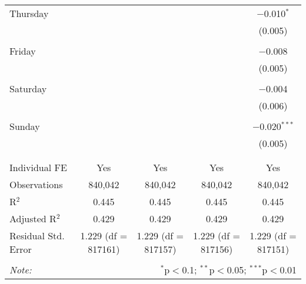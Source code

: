 \documentclass[
]{article}
\begin{document}
\begin{table}[!htbp]
{\begin{tabular}{@{\extracolsep{5pt}}lcccc}
 Thursday &  &  &  & $-$0.010$^{*}$ \\ 
  &  &  &  & (0.005) \\ 
  & & & & \\ 
 Friday &  &  &  & $-$0.008 \\ 
  &  &  &  & (0.005) \\ 
  & & & & \\ 
 Saturday &  &  &  & $-$0.004 \\ 
  &  &  &  & (0.006) \\ 
  & & & & \\ 
 Sunday &  &  &  & $-$0.020$^{***}$ \\ 
  &  &  &  & (0.005) \\ 
  & & & & \\ 
\hline \\[-1.8ex] 
Individual FE & Yes & Yes & Yes & Yes \\ 
Observations & 840,042 & 840,042 & 840,042 & 840,042 \\ 
R$^{2}$ & 0.445 & 0.445 & 0.445 & 0.445 \\ 
Adjusted R$^{2}$ & 0.429 & 0.429 & 0.429 & 0.429 \\ 
Residual Std. Error & 1.229 (df = 817161) & 1.229 (df = 817157) & 1.229 (df = 817156) & 1.229 (df = 817151) \\ 
\hline 
\hline \\[-1.8ex] 
\textit{Note:}  & \multicolumn{4}{r}{$^{*}$p$<$0.1; $^{**}$p$<$0.05; $^{***}$p$<$0.01} \\ 
\end{tabular}
} 
\end{table} 
\newpage
\end{document}
